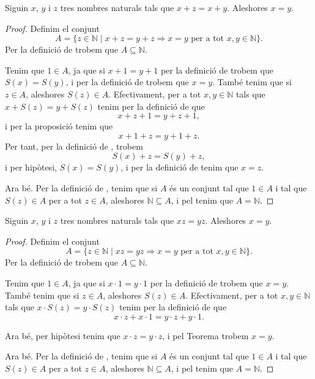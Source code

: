 \documentclass[../Apunts.tex]{subfiles}
\begin{document}
	\begin{theorem}
		\label{thm:podem tatxar per la suma nombres naturals}
		Siguin \(x\), \(y\) i \(z\) tres nombres naturals tals que \(x+z=x+y\). Aleshores \(x=y\).
		\begin{proof}
			Definim el conjunt
			\[A=\{z\in\mathbb{N}\mid x+z=y+z\Rightarrow x=y\text{ per a tot }x,y\in\mathbb{N}\}.\]
			Per la definició de  trobem que \(A\subseteq\mathbb{N}\).
			
			Tenim que \(1\in A\), ja que si \(x+1=y+1\) per la definició de  trobem que \(S(x)=S(y)\), i per la definició de  trobem que \(x=y\). També tenim que si \(z\in A\), aleshores \(S(z)\in A\). Efectivament, per a tot \(x,y\in\mathbb{N}\) tals que \(x+S(z)=y+S(z)\) tenim per la definició de  que
			\[x+z+1=y+z+1,\]
			i per la proposició  tenim que
			\[x+1+z=y+1+z.\]
			Per tant, per la definició de , trobem
			\[S(x)+z=S(y)+z,\]
			i per hipòtesi, \(S(x)=S(y)\), i per la definició de  tenim que \(x=z\).
			
			Ara bé. Per la definició de , tenim que si \(A\) és un conjunt tal que \(1\in A\) i tal que \(S(z)\in A\) per a tot \(z\in A\), aleshores \(\mathbb{N}\subseteq A\), i pel  tenim que \(A=\mathbb{N}\).
		\end{proof}
	\end{theorem}
	\begin{theorem}
		\label{thm:podem tatxar pel producte nombres naturals}
		Siguin \(x\), \(y\) i \(z\) tres nombres naturals tals que \(xz=yz\). Aleshores \(x=y\).
		\begin{proof}
			Definim el conjunt
			\[A=\{z\in\mathbb{N}\mid xz=yz\Rightarrow x=y\text{ per a tot }x,y\in\mathbb{N}\}.\]
			Per la definició de  trobem que \(A\subseteq\mathbb{N}\).
			
			Tenim que \(1\in A\), ja que si \(x\cdot1=y\cdot1\) per la definició de  trobem que \(x=y\). També tenim que si \(z\in A\), aleshores \(S(z)\in A\). Efectivament, per a tot \(x,y\in\mathbb{N}\) tals que \(x\cdot S(z)=y\cdot S(z)\) tenim per la definició de \myref{def:producte de nombres naturals} que
			\[x\cdot z+x\cdot1=y\cdot z+y\cdot1.\]
			
			Ara bé, per hipòtesi tenim que \(x\cdot z=y\cdot z\), i pel Teorema  trobem \(x=y\).
			
			Ara bé. Per la definició de , tenim que si \(A\) és un conjunt tal que \(1\in A\) i tal que \(S(z)\in A\) per a tot \(z\in A\), aleshores \(\mathbb{N}\subseteq A\), i pel  tenim que \(A=\mathbb{N}\).
		\end{proof}
	\end{theorem}
\end{document}
